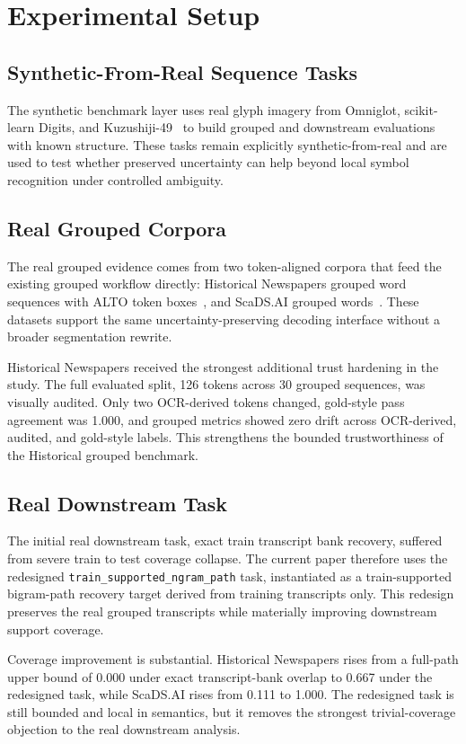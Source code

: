 \section{Experimental Setup}

\subsection{Synthetic-From-Real Sequence Tasks}

The synthetic benchmark layer uses real glyph imagery from Omniglot, scikit-learn Digits, and Kuzushiji-49~\cite{lake2015omniglot,pedregosa2011scikit,clanuwat2018kuzushiji} to build grouped and downstream evaluations with known structure. These tasks remain explicitly synthetic-from-real and are used to test whether preserved uncertainty can help beyond local symbol recognition under controlled ambiguity.

\subsection{Real Grouped Corpora}

The real grouped evidence comes from two token-aligned corpora that feed the existing grouped workflow directly: Historical Newspapers grouped word sequences with ALTO token boxes~\cite{historical_newspapers_gt}, and ScaDS.AI grouped words~\cite{scadsai_grouped_words}. These datasets support the same uncertainty-preserving decoding interface without a broader segmentation rewrite.

Historical Newspapers received the strongest additional trust hardening in the study. The full evaluated split, 126 tokens across 30 grouped sequences, was visually audited. Only two OCR-derived tokens changed, gold-style pass agreement was 1.000, and grouped metrics showed zero drift across OCR-derived, audited, and gold-style labels. This strengthens the bounded trustworthiness of the Historical grouped benchmark.

\subsection{Real Downstream Task}

The initial real downstream task, exact train transcript bank recovery, suffered from severe train to test coverage collapse. The current paper therefore uses the redesigned \texttt{train\_supported\_ngram\_path} task, instantiated as a train-supported bigram-path recovery target derived from training transcripts only. This redesign preserves the real grouped transcripts while materially improving downstream support coverage.

Coverage improvement is substantial. Historical Newspapers rises from a full-path upper bound of 0.000 under exact transcript-bank overlap to 0.667 under the redesigned task, while ScaDS.AI rises from 0.111 to 1.000. The redesigned task is still bounded and local in semantics, but it removes the strongest trivial-coverage objection to the real downstream analysis.
